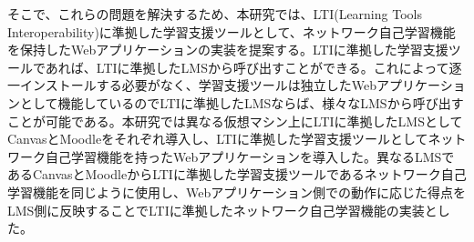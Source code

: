 そこで、これらの問題を解決するため、本研究では、LTI(Learning Tools Interoperability)に準拠した学習支援ツールとして、ネットワーク自己学習機能を保持したWebアプリケーションの実装を提案する。LTIに準拠した学習支援ツールであれば、LTIに準拠したLMSから呼び出すことができる。これによって逐一インストールする必要がなく、学習支援ツールは独立したWebアプリケーションとして機能しているのでLTIに準拠したLMSならば、様々なLMSから呼び出すことが可能である。本研究では異なる仮想マシン上にLTIに準拠したLMSとしてCanvasとMoodleをそれぞれ導入し、LTIに準拠した学習支援ツールとしてネットワーク自己学習機能を持ったWebアプリケーションを導入した。異なるLMSであるCanvasとMoodleからLTIに準拠した学習支援ツールであるネットワーク自己学習機能を同じように使用し、Webアプリケーション側での動作に応じた得点をLMS側に反映することでLTIに準拠したネットワーク自己学習機能の実装とした。\\
